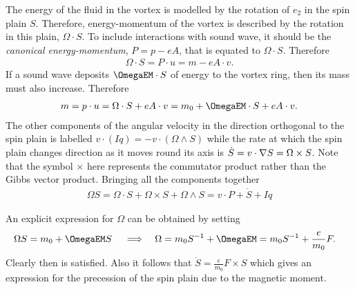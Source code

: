 The energy of the fluid in the vortex is modelled by the rotation of $e_2$ in the spin plain $S$.
Therefore, energy-momentum of the vortex is described by the rotation in this plain, $\Omega \cdot S$.
To include interactions with sound wave, 
it should be the  {\em canonical energy-momentum}, $P = p - eA$, that is equated to $\Omega \cdot S$.
Therefore
\begin{align}
  \Omega\cdot S = P \cdot u = m - eA\cdot v.
\end{align}
If a sound wave deposits $\OmegaEM \cdot S$ of energy to the vortex ring, then its mass must also increase.
Therefore
\begin{align}
  m  = p \cdot u =  \Omega \cdot S + eA\cdot v= m_0 + \OmegaEM \cdot S + eA\cdot v.
\end{align}
The other components of the angular velocity in the direction orthogonal to the spin plain is labelled $ v\cdot  ( I q) =- v\cdot (\Omega \wedge S)$
while the rate at which the spin plain changes direction as it moves round its axis is $\dot S = v \cdot \nabla S = \Omega \times S$.
Note that the symbol $\times$ here represents the commutator product rather than the Gibbs vector product.
Bringing all the components together
\begin{align}
\label{eqn:OmegaS}
\Omega S = \Omega \cdot S + \Omega \times S + \Omega \wedge S  = v \cdot P + \dot S + Iq
\end{align}

An explicit expression for $\Omega$ can be obtained by setting
\begin{align}
  \label{eqn:OmegaS2}
  \Omega S &= m_0 + \OmegaEM S && \implies & \Omega &= m_0 S^{-1} + \OmegaEM = m_0 S^{-1} + \frac{e}{m_0} F.
\end{align}
Clearly then  is satisfied.
Also it follows that  $\dot S = \frac{e}{m_0} F \times S$ which gives an expression for the precession of the spin plain due to the magnetic moment.

